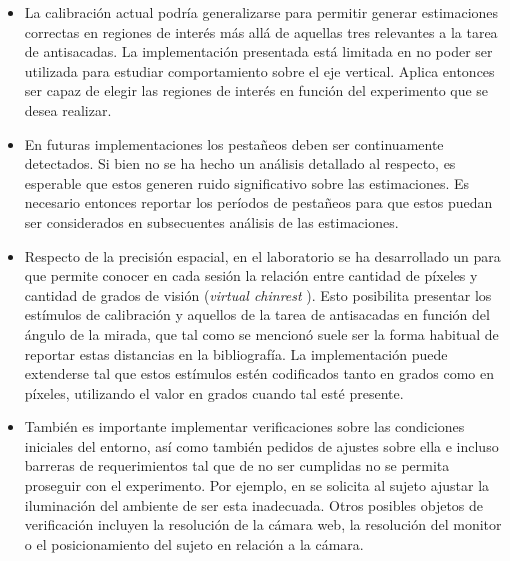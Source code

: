 \begin{itemize}
    \item
      La calibración actual podría generalizarse para permitir generar
      estimaciones correctas en regiones de interés más allá de aquellas tres
      relevantes a la tarea de antisacadas.
      La implementación presentada está limitada en no poder ser utilizada para
      estudiar comportamiento sobre el eje vertical.
      Aplica entonces ser capaz de elegir las regiones de interés en función
      del experimento que se desea realizar.
  
    \item
      En futuras implementaciones los pestañeos deben ser continuamente
      detectados.
      Si bien no se ha hecho un análisis detallado al respecto, es esperable
      que estos generen ruido significativo sobre las estimaciones.
      Es necesario entonces reportar los períodos de pestañeos para que estos
      puedan ser considerados en subsecuentes análisis de las estimaciones.
  
    \item
      Respecto de la precisión espacial, en el laboratorio se ha desarrollado
      un \plugin para \jspsych que permite conocer en cada sesión la
      relación entre cantidad de píxeles y cantidad de grados de visión
      (\textit{virtual chinrest} \cite{li_2020_virtual_chinrest}).
      Esto posibilita presentar los estímulos de calibración y aquellos de la
      tarea de antisacadas en función del ángulo de la mirada, que tal como se
      mencionó suele ser la forma habitual de reportar estas distancias en la
      bibliografía.
      La implementación puede extenderse tal que estos estímulos estén
      codificados tanto en grados como en píxeles, utilizando el valor en
      grados cuando tal \plugin esté presente.
  
    \item
      También es importante implementar verificaciones sobre las condiciones
      iniciales del entorno, así como también pedidos de ajustes sobre ella e
      incluso barreras de requerimientos tal que de no ser cumplidas no se
      permita proseguir con el experimento.
      Por ejemplo, en \turkergaze se solicita al sujeto ajustar la iluminación
      del ambiente de ser esta inadecuada.
      Otros posibles objetos de verificación incluyen la resolución de la
      cámara web, la resolución del monitor o el posicionamiento del sujeto en
      relación a la cámara.

  \end{itemize}

